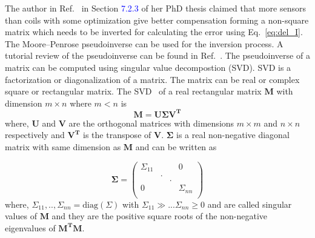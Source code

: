 
\FloatBarrier
The author in Ref.~\cite{bea} in Section \textcolor{blue}{7.2.3} of her PhD thesis claimed that more sensors than coils with some optimization give better compensation forming a non-square matrix which needs to be inverted for calculating the error using Eq.~\ref{eq:del_I}. The Moore--Penrose pseudoinverse can be used for the inversion process. A tutorial review of the pseudoinverse can be found in Ref.~\cite{pseudo}. The pseudoinverse of a matrix can be computed using singular value decompostion (SVD). SVD is a factorization or diagonalization of a matrix. The matrix can be real or complex square or rectangular matrix. The SVD~\cite{svd2,svd3} of a real rectangular matrix $\bm{M}$ with dimension $m \times n$ where $m<n$ is 
\begin{equation}\label{eq:m}
        \bm{M} = \bm{U} \bm{\Sigma} \bm{V^T}
\end{equation}
where, $\bm{U}$ and $\bm{V}$ are the orthogonal matrices with dimensions $m \times m$ and $n \times n$ respectively and $\bm{V^T}$ is the transpose of $\bm{V}$. $\bm{\Sigma}$ is a real non-negative diagonal matrix with same dimension as  $\bm{M}$ and can be written as

\begin{equation*}
\bm{\Sigma} = \begin{pmatrix} 
\Sigma_{11} &  &  & 0 \\
  & . &  &  \\
  &   & . &  \\

0 &  &  & \Sigma_{nn} \\
 \end{pmatrix}
\end{equation*}
where, $\Sigma_{11},..,\Sigma_{nn}=\text{diag}(\Sigma)$ with $\Sigma_{11}\gg... \Sigma_{nn}\geq0$ and are called singular values of $\bm{M}$  and they are the positive square roots of the non-negative eigenvalues of $\bm{M^T}\bm{M}$.

